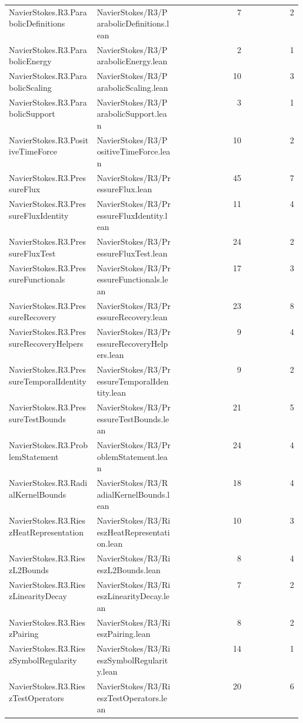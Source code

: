 \begin{longtable}{p{0.30\linewidth}p{0.28\linewidth}rr}
NavierStokes.R3.ParabolicDefinitions & NavierStokes/R3/ParabolicDefinitions.lean & 7 & 2\\
NavierStokes.R3.ParabolicEnergy & NavierStokes/R3/ParabolicEnergy.lean & 2 & 1\\
NavierStokes.R3.ParabolicScaling & NavierStokes/R3/ParabolicScaling.lean & 10 & 3\\
NavierStokes.R3.ParabolicSupport & NavierStokes/R3/ParabolicSupport.lean & 3 & 1\\
NavierStokes.R3.PositiveTimeForce & NavierStokes/R3/PositiveTimeForce.lean & 10 & 2\\
NavierStokes.R3.PressureFlux & NavierStokes/R3/PressureFlux.lean & 45 & 7\\
NavierStokes.R3.PressureFluxIdentity & NavierStokes/R3/PressureFluxIdentity.lean & 11 & 4\\
NavierStokes.R3.PressureFluxTest & NavierStokes/R3/PressureFluxTest.lean & 24 & 2\\
NavierStokes.R3.PressureFunctionals & NavierStokes/R3/PressureFunctionals.lean & 17 & 3\\
NavierStokes.R3.PressureRecovery & NavierStokes/R3/PressureRecovery.lean & 23 & 8\\
NavierStokes.R3.PressureRecoveryHelpers & NavierStokes/R3/PressureRecoveryHelpers.lean & 9 & 4\\
NavierStokes.R3.PressureTemporalIdentity & NavierStokes/R3/PressureTemporalIdentity.lean & 9 & 2\\
NavierStokes.R3.PressureTestBounds & NavierStokes/R3/PressureTestBounds.lean & 21 & 5\\
NavierStokes.R3.ProblemStatement & NavierStokes/R3/ProblemStatement.lean & 24 & 4\\
NavierStokes.R3.RadialKernelBounds & NavierStokes/R3/RadialKernelBounds.lean & 18 & 4\\
NavierStokes.R3.RieszHeatRepresentation & NavierStokes/R3/RieszHeatRepresentation.lean & 10 & 3\\
NavierStokes.R3.RieszL2Bounds & NavierStokes/R3/RieszL2Bounds.lean & 8 & 4\\
NavierStokes.R3.RieszLinearityDecay & NavierStokes/R3/RieszLinearityDecay.lean & 7 & 2\\
NavierStokes.R3.RieszPairing & NavierStokes/R3/RieszPairing.lean & 8 & 2\\
NavierStokes.R3.RieszSymbolRegularity & NavierStokes/R3/RieszSymbolRegularity.lean & 14 & 1\\
NavierStokes.R3.RieszTestOperators & NavierStokes/R3/RieszTestOperators.lean & 20 & 6\\

\end{longtable}
